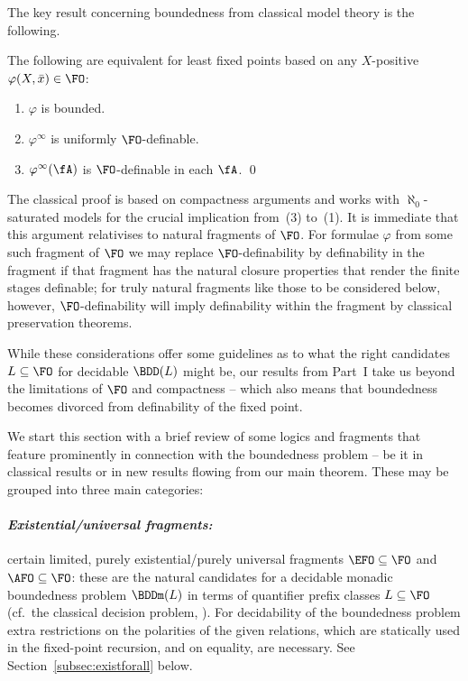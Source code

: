 \documentclass{LMCS}
\begin{document}
The key result concerning boundedness from classical
model theory is the following.

\begin{thm}
\label{thm:BMthm}
The following are equivalent for least fixed points
based on any $X$-positive $\varphi(X,\bar{x}) \in \FO$\?:
\begin{enumerate}
\item $\varphi$ is bounded.
\item $\varphi^\infty$ is uniformly $\FO$-definable.
\item $\varphi^\infty(\fA)$ is $\FO$-definable in each $\fA$.
\qed\end{enumerate}
\end{thm}

The classical proof is based on compactness arguments
and works with $\aleph_0$-saturated models for the crucial
implication from~(3) to~(1). It is immediate that this argument
relativises to natural fragments of $\FO$.
For formulae $\varphi$ from some such fragment of $\FO$ we
may replace $\FO$-definability by definability in the
fragment if that fragment has the natural closure properties
that render the finite stages definable\?; for truly natural
fragments like those to be considered below, however,
$\FO$-definability will imply definability within the
fragment by classical preservation theorems.

While these considerations offer some guidelines as to
what the right candidates $L \subseteq \FO$ for
decidable $\BDD(L)$ might be, our results from Part~I take
us beyond the limitations of $\FO$ and compactness --
which also means that boundedness becomes divorced from
definability of the fixed point.

\medskip
We start this section with a brief review of some logics and fragments
that feature prominently in connection with the boundedness problem --
be it in classical results or in new results flowing from our main theorem.
These may be grouped into three main categories\?:

\paragraph{\textit{Existential/universal fragments:}}
certain limited, purely existential/purely universal fragments
$\EFO \subseteq \FO$ and $\AFO\subseteq \FO$\?: these are the 
natural candidates
for a decidable monadic boundedness problem $\BDDm(L)$ in terms of quantifier
prefix classes $L \subseteq \FO$
(cf.\ the classical decision problem, \cite{BGG}).
For decidability of the boundedness problem
extra restrictions on the polarities of
the given relations,
which are statically used in the fixed-point recursion,
and on equality, are necessary.
See Section~\ref{subsec:existforall} below.
\end{document}
